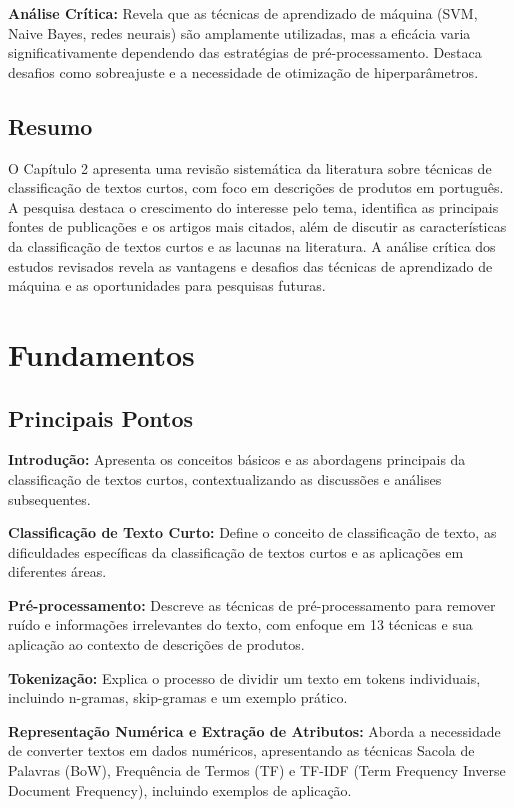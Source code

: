 \documentclass{report}
\begin{document}
\textbf{Análise Crítica:} Revela que as técnicas de aprendizado de máquina (SVM, Naive Bayes, redes neurais) são amplamente utilizadas, mas a eficácia varia significativamente dependendo das estratégias de pré-processamento. Destaca desafios como sobreajuste e a necessidade de otimização de hiperparâmetros.

\section*{Resumo}

O Capítulo 2 apresenta uma revisão sistemática da literatura sobre técnicas de classificação de textos curtos, com foco em descrições de produtos em português. A pesquisa destaca o crescimento do interesse pelo tema, identifica as principais fontes de publicações e os artigos mais citados, além de discutir as características da classificação de textos curtos e as lacunas na literatura. A análise crítica dos estudos revisados revela as vantagens e desafios das técnicas de aprendizado de máquina e as oportunidades para pesquisas futuras.

\chapter{Fundamentos}

\section*{Principais Pontos}

\textbf{Introdução:} Apresenta os conceitos básicos e as abordagens principais da classificação de textos curtos, contextualizando as discussões e análises subsequentes.

\textbf{Classificação de Texto Curto:} Define o conceito de classificação de texto, as dificuldades específicas da classificação de textos curtos e as aplicações em diferentes áreas.

\textbf{Pré-processamento:} Descreve as técnicas de pré-processamento para remover ruído e informações irrelevantes do texto, com enfoque em 13 técnicas e sua aplicação ao contexto de descrições de produtos.

\textbf{Tokenização:} Explica o processo de dividir um texto em tokens individuais, incluindo n-gramas, skip-gramas e um exemplo prático.

\textbf{Representação Numérica e Extração de Atributos:} Aborda a necessidade de converter textos em dados numéricos, apresentando as técnicas Sacola de Palavras (BoW), Frequência de Termos (TF) e TF-IDF (Term Frequency Inverse Document Frequency), incluindo exemplos de aplicação.
\end{document}
